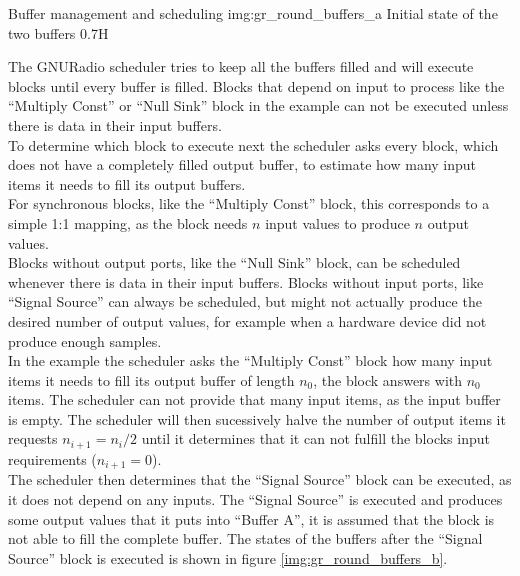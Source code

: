 \begin{subchapter}{Buffer management and scheduling}
               {img:gr_round_buffers_a}
               {Initial state of the two buffers}
               {0.7}{H}

  The GNURadio scheduler tries to keep all the buffers filled
  and will execute blocks until every buffer is filled.
  Blocks that depend on input to process like the ``Multiply Const''
  or ``Null Sink'' block in the example can not be executed
  unless there is data in their input buffers. \\

  To determine which block to execute next the scheduler
  asks every block, which does not have a completely filled
  output buffer, to estimate how many input items it needs to fill
  its output buffers. \\

  For synchronous blocks, like the ``Multiply Const'' block,
  this corresponds to a simple 1:1 mapping, as the block
  needs $n$ input values to produce $n$ output values. \\

  Blocks without output ports, like the ``Null Sink'' block,
  can be scheduled whenever there is data in their input
  buffers.
  Blocks without input ports, like ``Signal Source'' can
  always be scheduled, but might not actually produce the
  desired number of output values, for example when a
  hardware device did not produce enough samples. \\

  In the example the scheduler asks the ``Multiply Const''
  block how many input items it needs to fill
  its output buffer of length $n_0$, the block answers with
  $n_0$ items.
  The scheduler can not provide that many input items,
  as the input buffer is empty.
  The scheduler will then sucessively halve the number
  of output items it requests $n_{i+1}=n_i/2$ until
  it determines that it can not fulfill the blocks
  input requirements ($n_{i+1}=0$). \\

  The scheduler then determines that the ``Signal Source''
  block can be executed, as it does not depend on any
  inputs.
  The ``Signal Source'' is executed and produces some
  output values that it puts into ``Buffer A'', it is assumed
  that the block is not able to fill the complete buffer.
  The states of the buffers after the ``Signal Source''
  block is executed is shown in figure \ref{img:gr_round_buffers_b}. \\


\end{subchapter}
